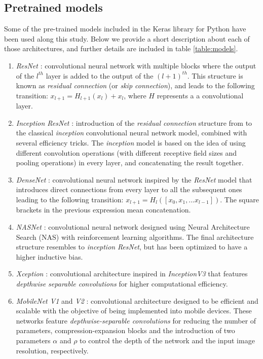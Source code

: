\subsection{Pretrained models}
Some of the pre-trained models included in the Keras library for Python \cite{chollet2015keras} have been used along this study. Below we provide a short description about each of those architectures, and further details are included in table \ref{table:models}.

\begin{enumerate}
   	\item \textit{ResNet} \cite{he2016}: convolutional neural network with multiple blocks where the output of the $l^{th}$ layer is added to the output of the $(l+1)^{th}$. This structure is known as \textit{residual connection} (or \textit{skip connection}), and leads to the following transition: $x_{l+1} = H_{l+1}(x_{l}) + x_l$, where $H$ represents a a convolutional layer.
   	\item \textit{Inception ResNet} \cite{szegedy2017}: introduction of the \textit{residual connection} structure from \cite{he2016} to the classical \textit{inception} convolutional neural network model, combined with several efficiency tricks. The \textit{inception} model is based on the idea of using different convolution operations (with different receptive field sizes and pooling operations) in every layer, and concatenating the result together.
   	\item \textit{DenseNet} \cite{huang2017}: convolutional neural network inspired by the \textit{ResNet} model \cite{he2016} that introduces direct connections from every layer to all the subsequent ones leading to the following transition: $x_{l+1} = H_l([x_0, x_1, ... x_{l-1}])$. The square brackets in the previous expression mean concatenation.
   	\item \textit{NASNet} \cite{pham2018}: convolutional neural network designed using Neural Architecture Search (NAS) with reinforcement learning algorithms. The final architecture structure resembles to \textit{inception} \textit{ResNet}, but has been optimized to have a higher inductive bias.
   	\item \textit{Xception} \cite{chollet2017}: convolutional architecture inspired in \textit{InceptionV3}  \cite{szegedy2016} that features \textit{depthwise separable convolutions} for higher computational efficiency.
   	\item \textit{MobileNet V1} and \textit{V2} \cite{howard2017, sandler2018}: convolutional architecture designed to be efficient and scalable with the objective of being implemented into mobile devices. These networks feature \textit{depthwise-separable convolutions} for reducing the number of parameters, compression-expansion blocks and the introduction of two parameters $\alpha$ and $\rho$ to control the depth of the network and the input image resolution, respectively.

\end{enumerate}

